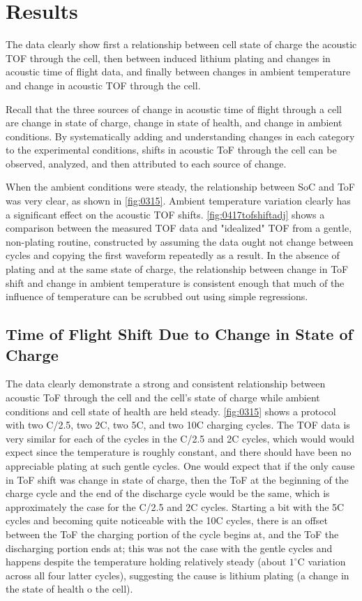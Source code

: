 \chapter{Results}

The data clearly show first a relationship between cell state of charge the acoustic TOF through the cell, then between induced lithium plating and changes in acoustic time of flight data, and finally between changes in ambient temperature and change in acoustic TOF through the cell. 

Recall that the three sources of change in acoustic time of flight through a cell are change in state of charge, change in state of health, and change in ambient conditions. 
By systematically adding and understanding changes in each category to the experimental conditions, shifts in acoustic ToF through the cell can be observed, analyzed, and then attributed to each source of change.

When the ambient conditions were steady, the relationship between SoC and ToF was very clear, as shown in \hyperref[fig:0315]{\cref{fig:0315}}. Ambient temperature variation clearly has a significant effect on the acoustic TOF shifts. \hyperref[fig:0417tofshiftadj]{\cref{fig:0417tofshiftadj}} shows a comparison between the measured TOF data and "idealized" TOF from a gentle, non-plating routine, constructed by assuming the data ought not change between cycles and copying the first waveform repeatedly as a result. In the absence of plating and at the same state of charge, the relationship between change in ToF shift and change in ambient temperature is consistent enough that much of the influence of temperature can be scrubbed out using simple regressions.

\section{Time of Flight Shift Due to Change in State of Charge}
The data clearly demonstrate a strong and consistent relationship between acoustic ToF through the cell and the cell's state of charge while ambient conditions and cell state of health are held steady.  \hyperref[fig:0315]{\cref{fig:0315}} shows a protocol with two C/2.5, two 2C, two 5C, and two 10C charging cycles. The TOF data is very similar for each of the cycles in the C/2.5 and 2C cycles, which would would expect since the temperature is roughly constant, and there should have been no appreciable plating at such gentle cycles. One would expect that if the only cause in ToF shift was change in state of charge, then the ToF at the beginning of the charge cycle and the end of the discharge cycle would be the same, which is approximately the case for the C/2.5 and 2C cycles. Starting a bit with the 5C cycles and becoming quite noticeable with the 10C cycles, there is an offset between the ToF the charging portion of the cycle begins at, and the ToF the discharging portion ends at; this was not the case with the gentle cycles and happens despite the temperature holding relatively steady (about $1^{\circ}$C variation across all four latter cycles), suggesting the cause is lithium plating (a change in the state of health o the cell).

